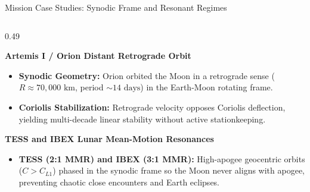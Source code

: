 \documentclass[aspectratio=169, 10pt]{beamer}
\begin{document}
\begin{frame}{Mission Case Studies: Synodic Frame and Resonant Regimes}
    \begin{columns}[t]
        \begin{column}{0.49\textwidth}
            \begin{block}{\textbf{Artemis I / Orion Distant Retrograde Orbit}}
                \scriptsize
                \begin{itemize}\setlength{\itemsep}{1.5pt}
                    \item \textbf{Synodic Geometry:} Orion orbited the Moon in a retrograde sense ($R \approx 70,000\text{ km}$, period $\sim 14\text{ days}$) in the Earth-Moon rotating frame.
                    \item \textbf{Coriolis Stabilization:} Retrograde velocity opposes Coriolis deflection, yielding multi-decade linear stability without active stationkeeping.
                \end{itemize}
            \end{block}
            \vspace{-0.15cm}
            \begin{block}{\textbf{TESS and IBEX Lunar Mean-Motion Resonances}}
                \scriptsize
                \begin{itemize}\setlength{\itemsep}{1.5pt}
                    \item \textbf{TESS (2:1 MMR) and IBEX (3:1 MMR):} High-apogee geocentric orbits ($C > C_{L1}$) phased in the synodic frame so the Moon never aligns with apogee, preventing chaotic close encounters and Earth eclipses.
                \end{itemize}
            \end{block}
        \end{column}
        

\end{columns}
\end{frame}
\end{document}
